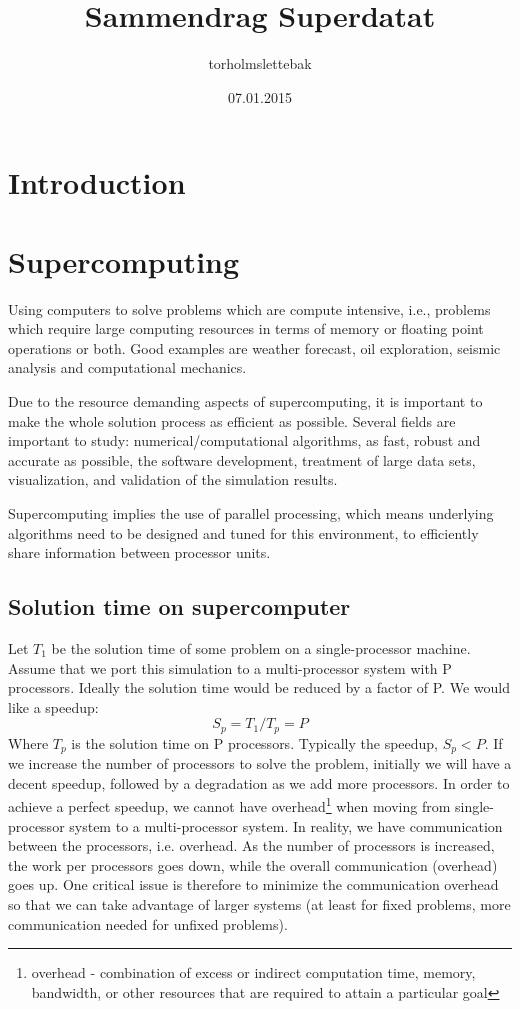 \documentclass{article}
\title{Sammendrag Superdatat}
\author{torholmslettebak }
\date{07.01.2015}
\begin{document}
\maketitle
\tableofcontents
\section{Introduction}

\section{Supercomputing}
Using computers to solve problems which are compute intensive, i.e., problems which require large computing resources in terms of memory or floating point operations or both.
Good examples are weather forecast, oil exploration, seismic analysis and computational mechanics.

Due to the resource demanding aspects of supercomputing, it is important to make the whole solution process as efficient as possible. Several fields are important to study:  numerical/computational algorithms, as fast, robust and accurate as possible, the software development, treatment of large data sets, visualization, and validation of the simulation results.

Supercomputing implies the use of parallel processing, which means underlying algorithms need to be designed and tuned for this environment, to efficiently share information between processor units.  
\subsection{Solution time on supercomputer}
Let $T_{1}$ be the solution time of some problem on a single-processor machine. Assume that we port this simulation to a multi-processor system with P processors. Ideally the solution time would be reduced by a factor of P. We would like a speedup: 
\begin{equation}
S_p = T_{1}/T_{p} = P 
\end{equation}
Where $T_{p}$ is the solution time on P processors. Typically the speedup, $S_{p} < P$. If we increase the number of processors to solve the problem, initially we will have a decent speedup, followed by a degradation as we add more processors. In order to achieve a perfect speedup, we cannot have overhead\footnote{ overhead - combination of excess or indirect computation time, memory, bandwidth, or other resources that are required to attain a particular goal} when moving from single-processor system to a multi-processor system. In reality, we have communication between the processors, i.e. overhead. As the number of processors is increased, the work per processors goes down, while the overall communication (overhead) goes up. One critical issue is therefore to minimize the communication overhead so that we can take advantage of larger systems (at least for fixed problems, more communication needed for unfixed problems). 
\end{document}
